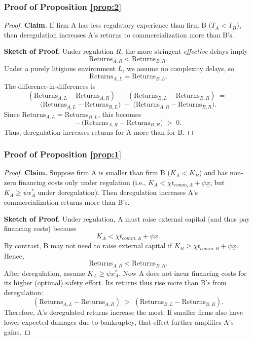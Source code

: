 \documentclass[letterpaper,12pt]{article}
\theoremstyle{definition}
\begin{document}
\subsubsection*{Proof of Proposition \ref{prop:2}}

\begin{proof}
\textbf{Claim.} If firm A has less regulatory experience than firm B (\(T_A < T_B\)), then deregulation increases A’s returns to commercialization more than B’s.

\noindent\textbf{Sketch of Proof.}
Under regulation \(R\), the more stringent \emph{effective} delays imply
\[
    \text{Returns}_{A,R} < \text{Returns}_{B,R}.
\]
Under a purely litigious environment \(L\), we assume no complexity delays, so
\[
    \text{Returns}_{A,L} = \text{Returns}_{B,L}.
\]
The difference-in-differences is
\[
    (\text{Returns}_{A,L} - \text{Returns}_{A,R})
    \;-\;
    (\text{Returns}_{B,L} - \text{Returns}_{B,R})
    \;=\;
    \]
   \[
    \bigl(\text{Returns}_{A,L} - \text{Returns}_{B,L}\bigr)
    \;-\;
    \bigl(\text{Returns}_{A,R} - \text{Returns}_{B,R}\bigr).
\]
Since \(\text{Returns}_{A,L} = \text{Returns}_{B,L}\), this becomes
\[
    -\,\bigl(\text{Returns}_{A,R} - \text{Returns}_{B,R}\bigr)
    \;>\; 0.
\]
Thus, deregulation increases returns for A more than for B.
\end{proof}

\subsubsection*{Proof of Proposition \ref{prop:1}}

\begin{proof}
\textbf{Claim.} Suppose firm A is smaller than firm B (\(K_A < K_B\)) and has non-zero financing costs only under regulation (i.e., \(K_A < \chi t_{comm,A} + \psi \underline{x}\), but \(K_A \ge \psi x^*_A\) under deregulation). Then deregulation increases A’s commercialization returns more than B’s.

\noindent\textbf{Sketch of Proof.}
Under regulation, A must raise external capital (and thus pay financing costs) because
\[
    K_A < \chi t_{comm,A} + \psi \underline{x}.
\]
By contrast, B may not need to raise external capital if \(K_B \ge \chi t_{comm,B} + \psi \underline{x}\). Hence,
\[
    \text{Returns}_{A,R} < \text{Returns}_{B,R}.
\]
After deregulation, assume \(K_A \ge \psi x^*_A\). Now A does not incur financing costs for its higher (optimal) safety effort. Its returns thus rise more than B’s from deregulation:
\[
    (\text{Returns}_{A,L} - \text{Returns}_{A,R}) 
    \;>\;
    (\text{Returns}_{B,L} - \text{Returns}_{B,R}).
\]
Therefore, A’s deregulated returns increase the most. If smaller firms also have lower expected damages due to bankruptcy, that effect further amplifies A’s gains.
\end{proof}
\end{document}
